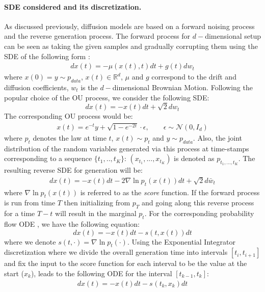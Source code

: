 \documentclass{article}
\begin{document}
\paragraph{SDE considered and its discretization.} As discussed previously, diffusion models are based on a forward noising process and the reverse generation process. The forward process for $d-$dimensional setup can be seen as taking the given samples and gradually corrupting them using the SDE of the following form \cite{song2020score}:
\begin{align*}
    dx(t) = -\mu  (x(t),t)dt + g(t)dw_t
\end{align*}
where $x(0)=y\sim p_{data}$, $x(t)\in \mathbb{R}^d$, $\mu$ and $g$ correspond to the drift and diffusion coefficients, $w_t$ is the $d-$dimensional Brownian Motion. Following the popular choice of the OU process, we consider the following SDE:
\[
dx(t) = -x(t)dt + \sqrt{2}d{w}_{t}
\]
The corresponding OU process would be:
\begin{align}
\label{fwd_process}
x(t) = e^{-t}y + \sqrt{1-e^{-2t}}\cdot \epsilon, \qquad \epsilon\sim \mathcal{N}(0,I_d)
\end{align}
where $p_t$ denotes the law at time $t$, $x(t)\sim p_t$ and $y\sim p_{data}$. Also, the joint distribution of the random variables generated via this process at time-stamps corresponding to a sequence $\{t_1,..,t_K\}$: $(x_{t_1},...,x_{t_K})$ is denoted as $p_{t_1,...,t_K}$.
The resulting reverse SDE \cite{song2020score} for generation will be:
\begin{align}
\label{reverse_true_sde}
dx(t) = -x(t)dt - 2\nabla \ln p_{t}(x(t))dt + \sqrt{2}d\bar{w}_t   
\end{align}
where $\nabla \ln p_{t}(x(t))$ is referred to as the \textit{score} function. If the forward process is run from time $T$ then initializing from $p_T$ and going along this reverse process for a time $T-t$ will result in the marginal $p_t$.
For the corresponding probability flow ODE \cite{song2020score}, we have the following equation:
\begin{equation}
dx(t) = -x(t)dt - s(t,x(t))dt
\label{eq:fode}
\end{equation}
where we denote $s(t,\cdot)=\nabla \ln p_t(\cdot)$. Using the Exponential Integrator discretization \cite{chen2023improved} where we divide the overall generation time into intervals $[t_i,t_{i+1}]$ and fix the input to the score function for each interval to be the value at the start ($x_{{k}}$), leads to the following ODE for the interval $[t_{k-1},t_{k}]$:
 \begin{align*}
 dx(t) = -x(t)dt -s_{}(t_{k}, x_{{k}})dt
\end{align*}
\end{document}
